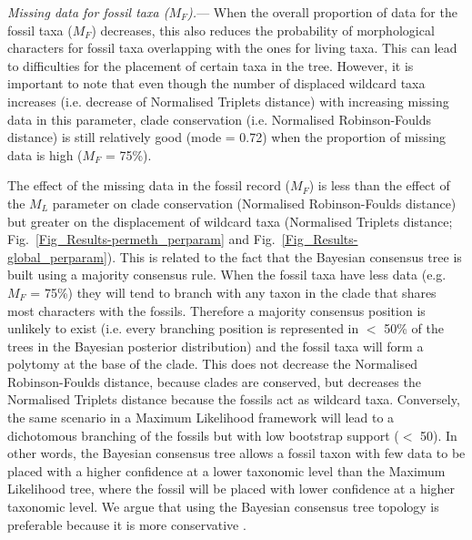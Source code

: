 \documentclass[12pt,letterpaper]{article}
\renewcommand{\subsubsection}[1]{%
\vspace{2ex}
\noindent
\textit{#1.}---}
\begin{document}
\subsubsection{Missing data for fossil taxa ($M_{F}$)}
When the overall proportion of data for the fossil taxa ($M_{F}$) decreases, this also reduces the probability of morphological characters for fossil taxa overlapping with the ones for living taxa. This can lead to difficulties for the placement of certain taxa in the tree. However, it is important to note that even though the number of displaced wildcard taxa increases (i.e. decrease of Normalised Triplets distance) with increasing missing data in this parameter, clade conservation (i.e. Normalised Robinson-Foulds distance) is still relatively good (mode = 0.72) when the proportion of missing data is high ($M_{F}$ = 75\%).

The effect of the missing data in the fossil record ($M_{F}$) is less than the effect of the $M_{L}$ parameter on clade conservation (Normalised Robinson-Foulds distance) but greater on the displacement of wildcard taxa (Normalised Triplets distance; Fig.~\ref{Fig_Results-permeth_perparam} and Fig.~\ref{Fig_Results-global_perparam}). This is related to the fact that the Bayesian consensus tree is built using a majority consensus rule. When the fossil taxa have less data (e.g. $M_{F}$ = 75\%) they will tend to branch with any taxon in the clade that shares most characters with the fossils. Therefore a majority consensus position is unlikely to exist (i.e. every branching position is represented in $<$ 50\% of the trees in the Bayesian posterior distribution) and the fossil taxa will form a polytomy at the base of the clade. This does not decrease the Normalised Robinson-Foulds distance, because clades are conserved, but decreases the Normalised Triplets distance because the fossils act as wildcard taxa. Conversely, the same scenario in a Maximum Likelihood framework will lead to a dichotomous branching of the fossils but with low bootstrap support ($<$ 50). In other words, the Bayesian consensus tree allows a fossil taxon with few data to be placed with a higher confidence at a lower taxonomic level than the Maximum Likelihood tree, where the fossil will be placed with lower confidence at a higher taxonomic level. We argue that using the Bayesian consensus tree topology is preferable because it is more conservative \cite[e.g][]{pattinsonphylogeny2014}.
\end{document}
